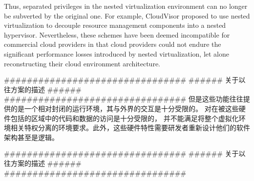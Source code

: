 Thus, separated privileges in the nested virtualization environment can no longer be subverted by the original one. For example, CloudVisor \cite{Zhang2011CloudVisor} proposed to use nested virtualization to decouple resource management components into a nested hypervisor. 
Nevertheless, these schemes have been deemed incompatible for commercial cloud providers in that cloud providers could not endure the significant performance losses introduced by nested virtualization, let alone reconstructing their cloud environment architecture.


\iffalse
################################
###### 关于以往方案的描述 ######
################################
但是这些功能往往提供的是一个相对封闭的运行环境，其与外界的交互是十分受限的。
对在被这些硬件包括的区域中的代码和数据的访问是十分受限的，
并不能满足将整个虚拟化环境相关特权分离的环境要求。此外，这些硬件特性需要研发者重新设计他们的软件架构甚至是逻辑。

################################
###### 关于以往方案的描述 ######
################################

